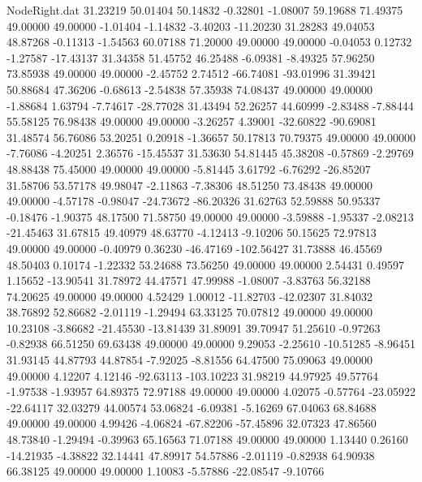 \begin{filecontents}{NodeRight.dat}
  31.23219   50.01404   50.14832    -0.32801   -1.08007   59.19688   71.49375   49.00000   49.00000   -1.01404   -1.14832   -3.40203  -11.20230
  31.28283   49.04053   48.87268    -0.11313   -1.54563   60.07188   71.20000   49.00000   49.00000   -0.04053    0.12732   -1.27587  -17.43137
  31.34358   51.45752   46.25488    -6.09381   -8.49325   57.96250   73.85938   49.00000   49.00000   -2.45752    2.74512  -66.74081  -93.01996
  31.39421   50.88684   47.36206    -0.68613   -2.54838   57.35938   74.08437   49.00000   49.00000   -1.88684    1.63794   -7.74617  -28.77028
  31.43494   52.26257   44.60999    -2.83488   -7.88444   55.58125   76.98438   49.00000   49.00000   -3.26257    4.39001  -32.60822  -90.69081
  31.48574   56.76086   53.20251     0.20918   -1.36657   50.17813   70.79375   49.00000   49.00000   -7.76086   -4.20251    2.36576  -15.45537
  31.53630   54.81445   45.38208    -0.57869   -2.29769   48.88438   75.45000   49.00000   49.00000   -5.81445    3.61792   -6.76292  -26.85207
  31.58706   53.57178   49.98047    -2.11863   -7.38306   48.51250   73.48438   49.00000   49.00000   -4.57178   -0.98047  -24.73672  -86.20326
  31.62763   52.59888   50.95337    -0.18476   -1.90375   48.17500   71.58750   49.00000   49.00000   -3.59888   -1.95337   -2.08213  -21.45463
  31.67815   49.40979   48.63770    -4.12413   -9.10206   50.15625   72.97813   49.00000   49.00000   -0.40979    0.36230  -46.47169 -102.56427
  31.73888   46.45569   48.50403     0.10174   -1.22332   53.24688   73.56250   49.00000   49.00000    2.54431    0.49597    1.15652  -13.90541
  31.78972   44.47571   47.99988    -1.08007   -3.83763   56.32188   74.20625   49.00000   49.00000    4.52429    1.00012  -11.82703  -42.02307
  31.84032   38.76892   52.86682    -2.01119   -1.29494   63.33125   70.07812   49.00000   49.00000   10.23108   -3.86682  -21.45530  -13.81439
  31.89091   39.70947   51.25610    -0.97263   -0.82938   66.51250   69.63438   49.00000   49.00000    9.29053   -2.25610  -10.51285   -8.96451
  31.93145   44.87793   44.87854    -7.92025   -8.81556   64.47500   75.09063   49.00000   49.00000    4.12207    4.12146  -92.63113 -103.10223
  31.98219   44.97925   49.57764    -1.97538   -1.93957   64.89375   72.97188   49.00000   49.00000    4.02075   -0.57764  -23.05922  -22.64117
  32.03279   44.00574   53.06824    -6.09381   -5.16269   67.04063   68.84688   49.00000   49.00000    4.99426   -4.06824  -67.82206  -57.45896
  32.07323   47.86560   48.73840    -1.29494   -0.39963   65.16563   71.07188   49.00000   49.00000    1.13440    0.26160  -14.21935   -4.38822
  32.14441   47.89917   54.57886    -2.01119   -0.82938   64.90938   66.38125   49.00000   49.00000    1.10083   -5.57886  -22.08547   -9.10766

\end{filecontents}
